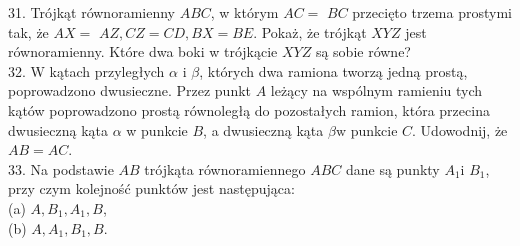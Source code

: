 \documentclass[10pt]{article}
\begin{document}
31. Trójkąt równoramienny \(A B C\), w którym \(A C=\) \(B C\) przecięto trzema prostymi tak, że \(A X=\) \(A Z, C Z=C D, B X=B E\). Pokaż, że trójkąt \(X Y Z\) jest równoramienny. Które dwa boki w trójkącie \(X Y Z\) są sobie równe?\\
32. W kątach przyległych \(\alpha\) i \(\beta\), których dwa ramiona tworzą jedną prostą, poprowadzono dwusieczne. Przez punkt \(A\) leżący na wspólnym ramieniu tych kątów poprowadzono prostą równoległą do pozostałych ramion, która przecina dwusieczną kąta \(\alpha\) w punkcie \(B\), a dwusieczną kąta \(\beta \mathrm{w}\) punkcie \(C\). Udowodnij, że \(A B=A C\).\\
33. Na podstawie \(A B\) trójkąta równoramiennego \(A B C\) dane są punkty \(A_{1} \mathrm{i}\) \(B_{1}\), przy czym kolejność punktów jest następująca:\\
(a) \(A, B_{1}, A_{1}, B\),\\
(b) \(A, A_{1}, B_{1}, B\).
\end{document}
